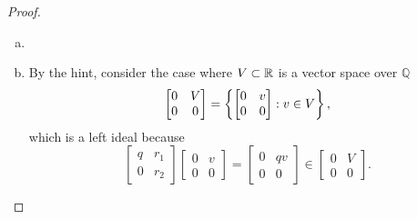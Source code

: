 \documentclass{article}
\begin{document}
\begin{proof} ~
  \begin{enumerate}[(a)]
    \item
    \item By the hint, consider the case where $V \subset \mathbb R$ is a vector
    space over $\mathbb Q$ \[
      \begin{bmatrix}  0 & V \\ 0 & 0  \end{bmatrix}
      = \left\{ 
        \begin{bmatrix}  0 & v \\ 0 & 0  \end{bmatrix} : v \in V
       \right\},
    \] which is a left ideal because \[
      \begin{bmatrix}  q & r_1 \\ 0 & r_2  \end{bmatrix}
      \begin{bmatrix}  0 & v \\ 0 & 0  \end{bmatrix} =
      \begin{bmatrix}  0 & qv \\ 0 & 0  \end{bmatrix} \in
      \begin{bmatrix}  0 & V \\ 0 & 0  \end{bmatrix}.
\]
\end{enumerate}
\end{proof}
\end{document}

